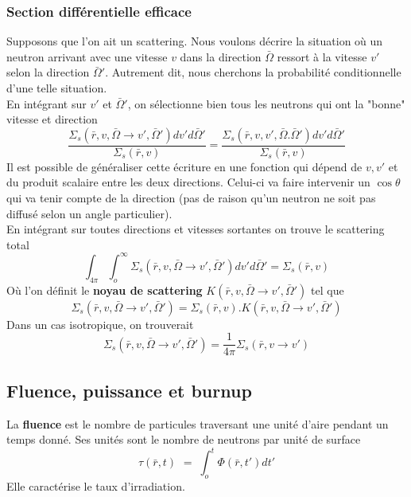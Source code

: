 \subsubsection{Section différentielle efficace}
Supposons que l'on ait un scattering. Nous voulons décrire la situation où un neutron arrivant avec 
une vitesse $v$ dans la direction $\bar\Omega$ ressort à la vitesse $v'$ selon la direction
$\bar\Omega'$. Autrement dit, nous cherchons la probabilité conditionnelle d'une telle situation.\\

En intégrant sur $v'$ et $\bar\Omega'$, on sélectionne bien tous les neutrons qui ont la "bonne" 
vitesse et direction
\begin{equation}
\frac{{{\Sigma _s}(\bar r,v,\bar \Omega  \to v',\bar \Omega ')dv'd\bar \Omega '}}{{{\Sigma _s}(\bar r,v)}} = \frac{{{\Sigma _s}(\bar r,v,v',\bar \Omega .\bar \Omega ')dv'd\bar \Omega '}}{{{\Sigma _s}(\bar r,v)}}
\end{equation}
Il est possible de généraliser cette écriture en une fonction qui dépend de $v,v'$ et du produit
scalaire entre les deux directions. Celui-ci va faire intervenir un $\cos\theta$ qui va tenir 
compte de la direction (pas de raison qu'un neutron ne soit pas diffusé selon un angle particulier).\\

En intégrant sur toutes directions et vitesses sortantes on trouve le scattering total
\begin{equation}
\int_{4\pi }   \int_o^\infty    {\Sigma _s}(\bar r,v,\bar \Omega  \to v',\bar \Omega ')dv'd\bar \Omega ' = \Sigma {}_s(\bar r,v)
\end{equation}
Où l'on définit le \textbf{noyau de scattering} $K(\bar r,v,\bar \Omega  \to v',\bar \Omega ')$ tel 
que
\begin{equation}
{\Sigma _s}(\bar r,v,\bar \Omega  \to v',\bar \Omega ') = \Sigma {}_s(\bar r,v).K(\bar r,v,\bar \Omega  \to v',\bar \Omega ')
\end{equation}
Dans un cas isotropique, on trouverait
\begin{equation}
{\Sigma _s}(\bar r,v,\bar \Omega  \to v',\bar \Omega ') = \frac{1}{{4\pi }}\Sigma {}_s(\bar r,v \to v')
\end{equation}



\subsection{Fluence, puissance et burnup}
La \textbf{fluence} est le nombre de particules traversant une unité d'aire pendant un temps donné. 
Ses unités sont le nombre de neutrons par unité de surface
\begin{equation}
\tau (\bar r,t)\,\, = \;\int_o^t \varPhi  (\bar r,t')dt'
\end{equation}
Elle caractérise le taux d'irradiation.\\

